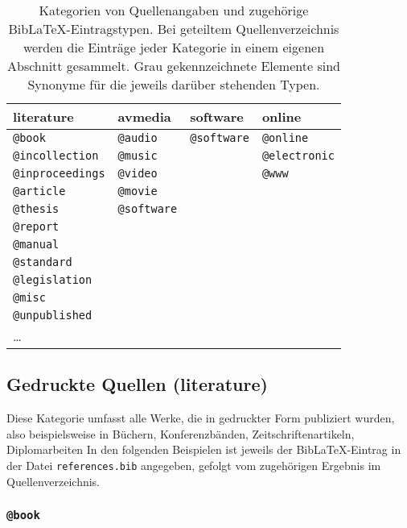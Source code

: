 \begin{table}
\caption{Kategorien von Quellenangaben und zugehörige BibLaTeX-Eintragstypen.
Bei geteiltem Quellenverzeichnis werden die Einträge jeder Kategorie in einem
eigenen Abschnitt gesammelt. Grau gekennzeichnete Elemente sind Synonyme für
die jeweils darüber stehenden Typen.}
\label{tab:BibKategorien}
\centering
{}
\setlength{\tabcolsep}{4mm}
\begin{tabular}{@{}llll@{}}
	\toprule
	\textsf{literature} & \textsf{avmedia} & \textsf{software} & \textsf{online} \\
	\midrule
	\texttt{@book} & \texttt{@audio} & \texttt{@software} & \texttt{@online} \\
	\texttt{@incollection} & \texttt{\color{midgray}@music} & & \texttt{\color{midgray}@electronic} \\
	\texttt{@inproceedings} & \texttt{@video} & & \texttt{\color{midgray}@www} \\
	\texttt{@article} & \texttt{@movie} & & \\
	\texttt{@thesis} & \texttt{@software} & & \\
	\texttt{@report} & & & \\
	\texttt{@manual} & & & \\
	\texttt{@standard} & & & \\
	\texttt{@legislation} & & & \\
	\texttt{@misc} & & &  \\
	\texttt{@unpublished} &  & & \\
	\ldots & & & \\
	\bottomrule
\end{tabular}
\end{table}



\subsection{Gedruckte Quellen (\textsf{literature})}
\label{sec:KategorieLiterature}

Diese Kategorie umfasst alle Werke, die in gedruckter Form publiziert wurden,
also beispielsweise in Büchern, Konferenzbänden, Zeitschriftenartikeln,
Diplomarbeiten \usw In den folgenden Beispielen ist jeweils der
BibLaTeX-Eintrag in der Datei \nolinkurl{references.bib} angegeben, gefolgt
vom zugehörigen Ergebnis im Quellenverzeichnis.


\subsubsection{\texttt{\bfseries @book}}
\label{sec:@book}

